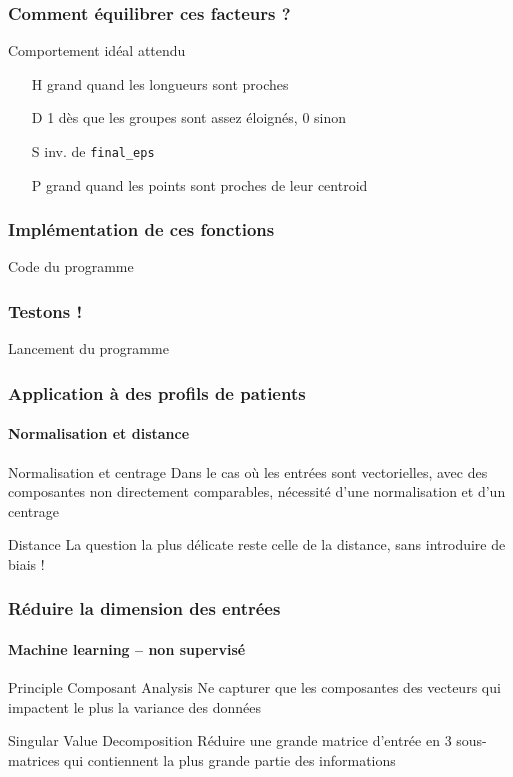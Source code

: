 \documentclass[]{beamer}
\begin{document}
\begin{frame}
  \frametitle{Comment équilibrer ces facteurs ?}

  \begin{block}{Comportement idéal attendu}
    \begin{itemize}
      \item[H] grand quand les longueurs sont proches
      \item[D] 1 dès que les groupes sont assez éloignés, 0 sinon
      \item[S] inv. de \tt{final\_eps}
      \item[P] grand quand les points sont proches de leur centroid
    \end{itemize}
  \end{block}
\end{frame}


\begin{frame}
  \frametitle{Implémentation de ces fonctions}
  \vfill{}
  \alert{Code du programme}
  \vfill{}
\end{frame}

\begin{frame}
  \frametitle{Testons !}
  \vfill{}
  \alert{Lancement du programme}
  \vfill{}
\end{frame}

\begin{frame}
  \frametitle{Application à des profils de patients}
  \framesubtitle{Normalisation et distance}

  \begin{block}{Normalisation et centrage}
    Dans le cas où les entrées sont vectorielles, avec des composantes non directement comparables, nécessité d'une normalisation et d'un centrage
  \end{block}

  \begin{alertblock}{Distance}
    La question la plus délicate reste celle de la distance, sans introduire de biais !
  \end{alertblock}

\end{frame}

\begin{frame}
  \frametitle{Réduire la dimension des entrées}
  \framesubtitle{Machine learning -- non supervisé}

  \begin{block}{Principle Composant Analysis}
    Ne capturer que les composantes des vecteurs qui impactent le plus la variance des données
  \end{block}

  \begin{exampleblock}{Singular Value Decomposition}
    Réduire une grande matrice d'entrée en 3 sous-matrices qui contiennent la plus grande partie des informations
  \end{exampleblock}

\end{frame}
\end{document}
